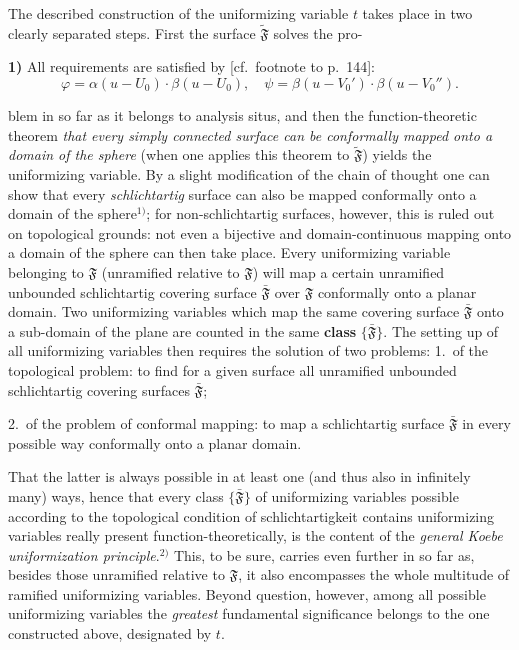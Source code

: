 \documentclass{article}
\begin{document}
The described construction of the uniformizing variable $t$ takes place in two clearly separated steps. First the surface $\widetilde{\mathfrak{F}}$ solves the pro-

\textbf{1)} All requirements are satisfied by [cf.\ footnote to p.~144]:
\[ \varphi = \alpha(u - U_0) \cdot \beta(u - U_0), \quad \psi = \beta(u - V_0') \cdot \beta(u - V_0''). \]

blem in so far as it belongs to analysis situs, and then the function-theoretic theorem \emph{that every simply connected surface can be conformally mapped onto a domain of the sphere} (when one applies this theorem to $\widetilde{\mathfrak{F}}$) yields the uniformizing variable. By a slight modification of the chain of thought one can show that every \emph{schlichtartig} surface can also be mapped conformally onto a domain of the sphere${}^{1)}$; for non-schlichtartig surfaces, however, this is ruled out on topological grounds: not even a bijective and domain-continuous mapping onto a domain of the sphere can then take place. Every uniformizing variable belonging to $\mathfrak{F}$ (unramified relative to $\mathfrak{F}$) will map a certain unramified unbounded schlichtartig covering surface $\bar{\mathfrak{F}}$ over $\mathfrak{F}$ conformally onto a planar domain. Two uniformizing variables which map the same covering surface $\bar{\mathfrak{F}}$ onto a sub-domain of the plane are counted in the same \textbf{class} $\{\bar{\mathfrak{F}}\}$. The setting up of all uniformizing variables then requires the solution of two problems:
1.\ of the topological problem: to find for a given surface all unramified unbounded schlichtartig covering surfaces $\bar{\mathfrak{F}}$;

2.\ of the problem of conformal mapping: to map a schlichtartig surface $\bar{\mathfrak{F}}$ in every possible way conformally onto a planar domain.

That the latter is always possible in at least one (and thus also in infinitely many) ways, hence that every class $\{\bar{\mathfrak{F}}\}$ of uniformizing variables possible according to the topological condition of schlichtartigkeit contains uniformizing variables really present function-theoretically, is the content of the \emph{general Koebe uniformization principle}.${}^{2)}$ This, to be sure, carries even further in so far as, besides those unramified relative to $\mathfrak{F}$, it also encompasses the whole multitude of ramified uniformizing variables. Beyond question, however, among all possible uniformizing variables the \emph{greatest} fundamental significance belongs to the one constructed above, designated by $t$.
\end{document}
